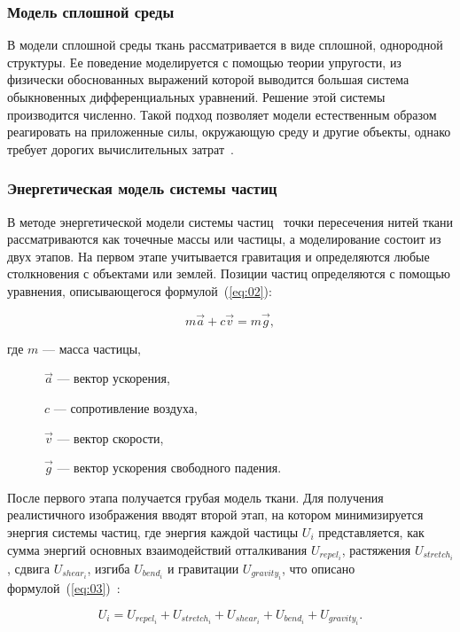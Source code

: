\subsubsection{Модель сплошной среды}

В модели сплошной среды ткань рассматривается в виде сплошной, однородной
структуры. Ее поведение моделируется с помощью теории упругости, из физически
обоснованных выражений которой выводится большая система обыкновенных
дифференциальных уравнений. Решение этой системы производится численно. Такой
подход позволяет модели естественным образом реагировать на приложенные силы,
окружающую среду и другие объекты, однако требует дорогих вычислительных
затрат~\cite{bib12, bib15}.

\subsubsection{Энергетическая модель системы частиц}

В методе энергетической модели системы частиц~\cite{bib13} точки пересечения
нитей ткани рассматриваются как точечные массы или частицы, а моделирование
состоит из двух этапов. На первом этапе учитывается гравитация и  определяются
любые столкновения с объектами или землей. Позиции частиц определяются с помощью
уравнения, описывающегося формулой~(\ref{eq:02}):

\begin{equation}\label{eq:02}
    m\vec{a}+c\vec{v}=m\vec{g},
\end{equation}

где $m$ --- масса частицы,

~~~~~~$\vec{a}$ --- вектор ускорения,

~~~~~~$c$ --- сопротивление воздуха,

~~~~~~$\vec{v}$ --- вектор скорости,

~~~~~~$\vec{g}$ --- вектор ускорения свободного падения.

После первого этапа получается грубая модель ткани. Для получения реалистичного
изображения вводят второй этап, на котором минимизируется энергия системы
частиц, где энергия каждой частицы $U_i$ представляется, как сумма энергий
основных взаимодействий отталкивания $U_{repel_i}$, растяжения $U_{stretch_i}$,
сдвига $U_{shear_i}$, изгиба $U_{bend_i}$ и гравитации
$U_{gravity_i}$, что описано формулой~(\ref{eq:03})~\cite{bib07}:

\begin{equation}\label{eq:03}
U_i=U_{repel_i}+U_{stretch_i}+U_{shear_i}+U_{bend_i}+U_{gravity_i}.
\end{equation}

